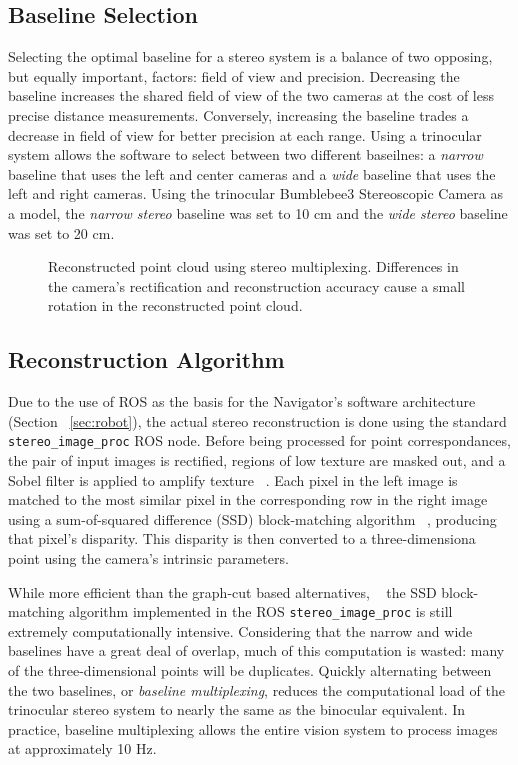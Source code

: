 \documentclass[11pt,twocolumn]{article}
\begin{document}
\subsection{Baseline Selection}
\label{sec:stereo-mux}
Selecting the optimal baseline for a stereo system is a balance of two
opposing, but equally important, factors: field of view and precision.
Decreasing the baseline increases the shared field of view of the two cameras
at the cost of less precise distance measurements. Conversely, increasing the
baseline trades a decrease in field of view for better precision at each
range. Using a trinocular system allows the software to select between
two different baseilnes: a \textit{narrow} baseline that uses the left and
center cameras and a \textit{wide} baseline that uses the left and right
cameras. Using the trinocular Bumblebee3 Stereoscopic Camera as a model, the
\textit{narrow stereo} baseline was set to 10 cm and the \textit{wide stereo}
baseline was set to 20 cm.

\begin{figure*}
	\centering
	\caption{
		Reconstructed point cloud using stereo multiplexing. Differences in the
		camera's rectification and reconstruction accuracy cause a small
		rotation in the reconstructed point cloud.
	}
	\label{fig:stereo-dist}
\end{figure*}

\subsection{Reconstruction Algorithm}
\label{sec:stereo-algo}
Due to the use of ROS as the basis for the Navigator's software architecture
(Section ~\ref{sec:robot}), the actual stereo reconstruction is done using the
standard \texttt{stereo\_image\_proc} ROS node. Before being processed for
point correspondances, the pair of input images is rectified, regions of low
texture are masked out, and a Sobel filter is applied to amplify texture
~\cite{stereo}. Each pixel in the left image is matched to the most similar
pixel in the corresponding row in the right image using a sum-of-squared
difference (SSD) block-matching algorithm ~\cite{stereo}, producing that
pixel's disparity. This disparity is then converted to a three-dimensiona point
using the camera's intrinsic parameters.

While more efficient than the graph-cut based alternatives, ~\cite{stereo} the
SSD block-matching algorithm implemented in the ROS
\texttt{stereo\_image\_proc} is still extremely computationally intensive.
Considering that the narrow and wide baselines have a great deal of overlap,
much of this computation is wasted: many of the three-dimensional points will
be duplicates. Quickly alternating between the two baselines, or
\textit{baseline multiplexing}, reduces the computational load of the
trinocular stereo system to nearly the same as the binocular equivalent. In
practice, baseline multiplexing allows the entire vision system to process
images at approximately 10 Hz.
\end{document}
